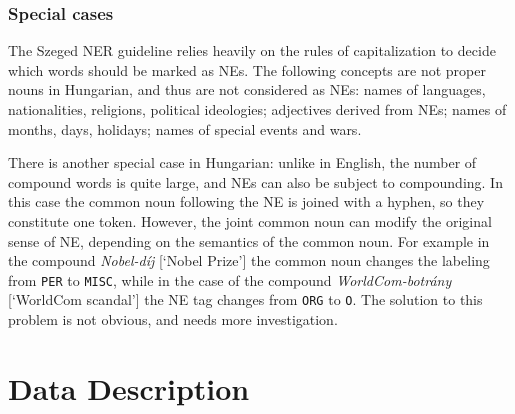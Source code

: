 \documentclass[11pt]{article}
\begin{document}
\subsubsection{Special cases}

The Szeged NER guideline relies heavily on the rules of capitalization to
decide which words should be marked as NEs. The following concepts are not
proper nouns in Hungarian, and thus are not considered as NEs: names of
languages, nationalities, religions, political ideologies; adjectives derived
from NEs; names of months, days, holidays; names of special events and wars.


There is another special case in Hungarian: unlike in English, the number of
compound words is quite large, and NEs can also be subject to compounding. In
this case the common noun following the NE is joined with a hyphen, so they
constitute one token. However, the joint common noun can modify the original
sense of NE, depending on the semantics of the common noun. For example in
the compound \textit{Nobel-díj} [`Nobel Prize'] the common noun changes the
labeling from \texttt{PER} to \texttt{MISC}, while
in the case of the compound \textit{WorldCom-botrány} [`WorldCom scandal'] the NE tag changes from \texttt{ORG} to \texttt{O}. The solution to this problem is not obvious, and needs more investigation.


\section{Data Description}
\label{sec:data}
\end{document}
